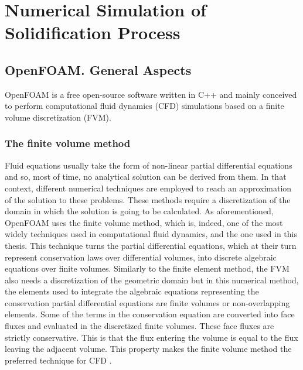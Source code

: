 
\chapter{Numerical Simulation of Solidification Process} %

\label{Chapter3} %
\section{OpenFOAM. General Aspects}
OpenFOAM is a free open-source software written in C++ and mainly conceived to perform computational fluid dynamics (CFD) simulations based on a finite volume discretization (FVM). 
\subsection{The finite volume method}
Fluid equations usually take the form of non-linear partial differential equations and so, most of time, no analytical solution can be derived from them. In that context, different numerical techniques are employed to reach an approximation of the solution to these problems. These methods require a discretization of the domain in which the solution is going to be calculated. As aforementioned, OpenFOAM uses the finite volume method, which is, indeed, one of the most widely techniques used in computational fluid dynamics, and the one used in this thesis.
\newline
This technique turns the partial differential equations, which at their turn represent conservation laws over differential volumes, into discrete algebraic equations over finite volumes. Similarly to the finite element method, the FVM also needs a discretization of the geometric domain but in this numerical method, the elements used to integrate the algebraic equations representing the conservation partial differential equations are finite volumes or non-overlapping elements.
\newline
Some of the terms in the conservation equation are converted into face fluxes and evaluated in the discretized finite volumes. These face fluxes are strictly conservative. This is that the flux entering the volume is equal to the flux leaving the adjacent volume. This property makes the finite volume method the preferred technique for CFD \cite{moukalled_mangani_darwish_2016}. 
